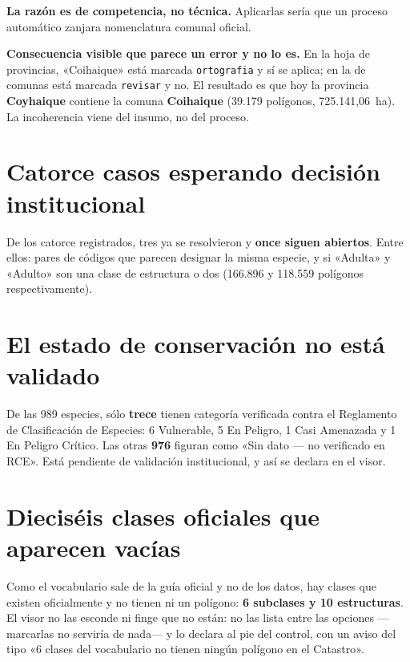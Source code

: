 \documentclass[11pt,a4paper]{report}
\newcommand{\campo}[1]{\textcolor{conaf}{\textbf{#1}}}
\newcommand{\orig}[1]{\texttt{\small #1}}
\begin{document}
\begin{nota}
\campo{La razón es de competencia, no técnica.} Aplicarlas sería que un proceso
automático zanjara nomenclatura comunal oficial.
\end{nota}

\begin{alerta}
\campo{Consecuencia visible que parece un error y no lo es.} En la hoja de
provincias, «Coihaique» está marcada \orig{ortografia} y sí se aplica; en la de
comunas está marcada \orig{revisar} y no. El resultado es que hoy la provincia
\campo{Coyhaique} contiene la comuna \campo{Coihaique} (39.179 polígonos,
725.141,06~ha). La incoherencia viene del insumo, no del proceso.
\end{alerta}

\section{Catorce casos esperando decisión institucional}

De los catorce registrados, tres ya se resolvieron y \textbf{once siguen
abiertos}. Entre ellos: pares de códigos que parecen designar la misma especie,
y si «Adulta» y «Adulto» son una clase de estructura o dos (166.896 y 118.559
polígonos respectivamente).

\section{El estado de conservación no está validado}

\begin{alerta}
De las 989 especies, sólo \textbf{trece} tienen categoría verificada contra el
Reglamento de Clasificación de Especies: 6 Vulnerable, 5 En Peligro, 1 Casi
Amenazada y 1 En Peligro Crítico. Las otras \textbf{976} figuran como «Sin dato
--- no verificado en RCE». Está pendiente de validación institucional, y así se
declara en el visor.
\end{alerta}

\section{Dieciséis clases oficiales que aparecen vacías}

Como el vocabulario sale de la guía oficial y no de los datos, hay clases que
existen oficialmente y no tienen ni un polígono: \textbf{6 subclases y 10
estructuras}. El visor no las esconde ni finge que no están: no las lista entre
las opciones —marcarlas no serviría de nada— y lo declara al pie del control,
con un aviso del tipo «6 clases del vocabulario no tienen ningún polígono en el
Catastro».
\end{document}
